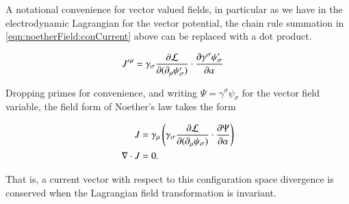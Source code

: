 A notational convenience for vector valued fields, in particular as we have in the electrodynamic Lagrangian for the vector potential, the chain rule summation in
\ref{eqn:noetherField:conCurrent} above can be replaced with a dot product.

\begin{align*}
{J'}^\mu &= \gamma_\sigma \frac{\partial {\mathcal{L}}}{\partial {(\partial_\mu \psi_\sigma')}} \cdot \frac{\partial {\gamma^\sigma \psi_\sigma'}}{\partial {\alpha}} 
\end{align*}

Dropping primes for convenience, and writing $\Psi = \gamma^\sigma \psi_\sigma$ for the vector field variable,
the field form of Noether's law takes the form

\begin{align}\label{eqn:noetherField:NoethersVector}
J &= \gamma_\mu \left( \gamma_\sigma \frac{\partial {\mathcal{L}}}{\partial {(\partial_\mu \psi_\sigma)}} \cdot \frac{\partial {\Psi}}{\partial {\alpha}} \right) \\
\nabla \cdot J &= 0.
\end{align}

That is, a current vector with respect to this configuration space divergence is conserved when the Lagrangian field transformation is invariant.
